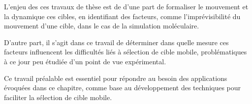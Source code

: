 	
	L'enjeu des ces travaux de thèse est de d'une part de formaliser le mouvement et la dynamique ces cibles, en identifiant des facteurs, comme l'imprévisibilité du mouvement d'une cible, dans le cas de la simulation moléculaire. 
	
	D'autre part, il s'agit dans ce travail de déterminer dans quelle mesure ces facteurs  influencent les difficultés liés à sélection de cible mobile, problématiques à ce jour peu étudiée d'un point de vue expérimental.  

    Ce travail préalable est essentiel pour répondre au besoin des applications évoquées dans ce chapitre, comme base au développement des techniques pour faciliter la sélection de cible mobile.
	 
	 
\clearpage

